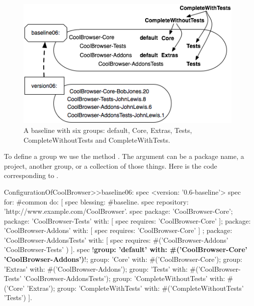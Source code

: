 \documentclass[a4paper,10pt,twoside]{book}
\begin{document}
\begin{figure}
\begin{center}
\includegraphics[width=0.9\linewidth]{version06}
\caption{A baseline with six groups: default, Core, Extras, Tests, CompleteWithoutTests and CompleteWithTests.\label{fig:version06}}
\end{center}
\end{figure}


To define a group we use the method \mbox{.} The  argument can be a package name, a project, another group, or a collection of those things.  Here is the code corresponding to .


\begin{code}{}
ConfigurationOfCoolBrowser>>baseline06: spec
     <version: '0.6-baseline'>
     spec for: #common do: [
          spec blessing: #baseline.
          spec repository: 'http://www.example.com/CoolBrowser'.
          spec
                 package: 'CoolBrowser-Core';
                 package: 'CoolBrowser-Tests' with: [ spec requires: 'CoolBrowser-Core' ];
                 package: 'CoolBrowser-Addons' with: [ spec requires: 'CoolBrowser-Core' ] ;
                 package: 'CoolBrowser-AddonsTests' with: [
                      spec requires: #('CoolBrowser-Addons' 'CoolBrowser-Tests' ) ].
          spec
                 !\textbf{group: 'default' with: \#('CoolBrowser-Core' 'CoolBrowser-Addons')}!;
                 group: 'Core' with: #('CoolBrowser-Core');
                 group: 'Extras' with: #('CoolBrowser-Addons');
                 group: 'Tests' with: #('CoolBrowser-Tests' 'CoolBrowser-AddonsTests');
                 group: 'CompleteWithoutTests' with: #('Core' 'Extras');
                 group: 'CompleteWithTests' with: #('CompleteWithoutTests' 'Tests')
               ].
\end{code}
\end{document}
